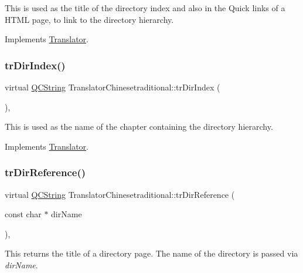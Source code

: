 This is used as the title of the directory index and also in the Quick links of a H\+T\+ML page, to link to the directory hierarchy. 

Implements \mbox{\hyperlink{class_translator}{Translator}}.

\mbox{\label{class_translator_chinesetraditional_a23a47a7d90fd4f1c79b1f89ad851a2fd}} 
\subsubsection{\texorpdfstring{trDirIndex()}{trDirIndex()}}
{\footnotesize\ttfamily virtual \mbox{\hyperlink{class_q_c_string}{Q\+C\+String}} Translator\+Chinesetraditional\+::tr\+Dir\+Index (\begin{DoxyParamCaption}{ }\end{DoxyParamCaption})\hspace{0.3cm}{\ttfamily [inline]}, {\ttfamily [virtual]}}

This is used as the name of the chapter containing the directory hierarchy. 

Implements \mbox{\hyperlink{class_translator}{Translator}}.

\mbox{\label{class_translator_chinesetraditional_af0b29374505eb9f3e3fc38c766c122a9}} 
\subsubsection{\texorpdfstring{trDirReference()}{trDirReference()}}
{\footnotesize\ttfamily virtual \mbox{\hyperlink{class_q_c_string}{Q\+C\+String}} Translator\+Chinesetraditional\+::tr\+Dir\+Reference (\begin{DoxyParamCaption}\item[{const char $\ast$}]{dir\+Name }\end{DoxyParamCaption})\hspace{0.3cm}{\ttfamily [inline]}, {\ttfamily [virtual]}}

This returns the title of a directory page. The name of the directory is passed via {\itshape dir\+Name}. 

